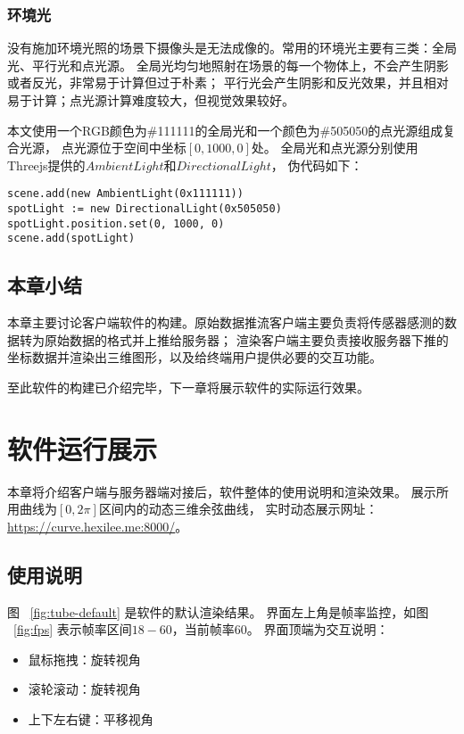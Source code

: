 \subsubsection{环境光}

没有施加环境光照的场景下摄像头是无法成像的。常用的环境光主要有三类：全局光、平行光和点光源。
全局光均匀地照射在场景的每一个物体上，不会产生阴影或者反光，非常易于计算但过于朴素；
平行光会产生阴影和反光效果，并且相对易于计算；点光源计算难度较大，但视觉效果较好。

本文使用一个RGB颜色为\#111111的全局光和一个颜色为\#505050的点光源组成复合光源，
点光源位于空间中坐标$[0, 1000, 0]$处。
全局光和点光源分别使用Threejs提供的$AmbientLight$和$DirectionalLight$，
伪代码如下：

\begin{lstlisting}[caption={环境光}]
scene.add(new AmbientLight(0x111111))
spotLight := new DirectionalLight(0x505050)
spotLight.position.set(0, 1000, 0)
scene.add(spotLight)
\end{lstlisting}

\subsection{本章小结}
本章主要讨论客户端软件的构建。原始数据推流客户端主要负责将传感器感测的数据转为原始数据的格式并上推给服务器；
渲染客户端主要负责接收服务器下推的坐标数据并渲染出三维图形，以及给终端用户提供必要的交互功能。

至此软件的构建已介绍完毕，下一章将展示软件的实际运行效果。

\clearpage

\section{软件运行展示}
\label{sec:pre}
本章将介绍客户端与服务器端对接后，软件整体的使用说明和渲染效果。
展示所用曲线为$[0, 2\pi]$区间内的动态三维余弦曲线，
实时动态展示网址：\\ \href{https://curve.hexilee.me:8000/}{https://curve.hexilee.me:8000/}。

\subsection{使用说明}
\FloatBarrier

图 ~\ref{fig:tube-default} 是软件的默认渲染结果。
界面左上角是帧率监控，如图 ~\ref{fig:fps} 表示帧率区间$18-60$，当前帧率$60$。
界面顶端为交互说明：

\begin{itemize}
\item 鼠标拖拽：旋转视角
\item 滚轮滚动：旋转视角
\item 上下左右键：平移视角
\end{itemize}

